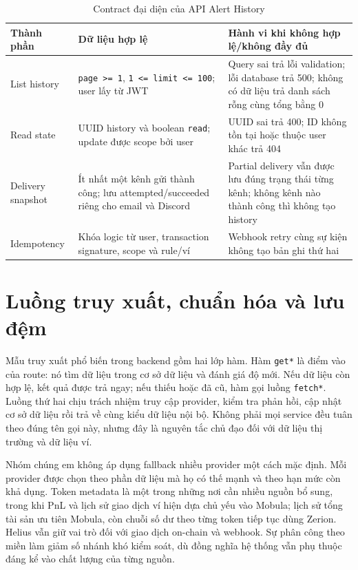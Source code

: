 \begin{table}[H]
\centering
\caption{Contract đại diện của API Alert History}
\label{tab:alert-history-contract}
\renewcommand{\arraystretch}{1.15}
\small
\begin{tabularx}{\textwidth}{|p{3.2cm}|X|X|}
\hline
\textbf{Thành phần} & \textbf{Dữ liệu hợp lệ} & \textbf{Hành vi khi không hợp lệ/không đầy đủ} \\
\hline
List history & \texttt{page >= 1}, \texttt{1 <= limit <= 100}; user lấy từ JWT & Query sai trả lỗi validation; lỗi database trả 500; không có dữ liệu trả danh sách rỗng cùng tổng bằng 0 \\
\hline
Read state & UUID history và boolean \texttt{read}; update được scope bởi user & UUID sai trả 400; ID không tồn tại hoặc thuộc user khác trả 404 \\
\hline
Delivery snapshot & Ít nhất một kênh gửi thành công; lưu attempted/succeeded riêng cho email và Discord & Partial delivery vẫn được lưu đúng trạng thái từng kênh; không kênh nào thành công thì không tạo history \\
\hline
Idempotency & Khóa logic từ user, transaction signature, scope và rule/ví & Webhook retry cùng sự kiện không tạo bản ghi thứ hai \\
\hline
\end{tabularx}
\end{table}

\section{Luồng truy xuất, chuẩn hóa và lưu đệm}

Mẫu truy xuất phổ biến trong backend gồm hai lớp hàm. Hàm \texttt{get*} là điểm vào của route: nó tìm dữ liệu trong cơ sở dữ liệu và đánh giá độ mới. Nếu dữ liệu còn hợp lệ, kết quả được trả ngay; nếu thiếu hoặc đã cũ, hàm gọi luồng \texttt{fetch*}. Luồng thứ hai chịu trách nhiệm truy cập provider, kiểm tra phản hồi, cập nhật cơ sở dữ liệu rồi trả về cùng kiểu dữ liệu nội bộ. Không phải mọi service đều tuân theo đúng tên gọi này, nhưng đây là nguyên tắc chủ đạo đối với dữ liệu thị trường và dữ liệu ví.

Nhóm chúng em không áp dụng fallback nhiều provider một cách mặc định. Mỗi provider được chọn theo phần dữ liệu mà họ có thế mạnh và theo hạn mức còn khả dụng. Token metadata là một trong những nơi cần nhiều nguồn bổ sung, trong khi PnL và lịch sử giao dịch ví hiện dựa chủ yếu vào Mobula; lịch sử tổng tài sản ưu tiên Mobula, còn chuỗi số dư theo từng token tiếp tục dùng Zerion. Helius vẫn giữ vai trò đối với giao dịch on-chain và webhook. Sự phân công theo miền làm giảm số nhánh khó kiểm soát, dù đồng nghĩa hệ thống vẫn phụ thuộc đáng kể vào chất lượng của từng nguồn.

